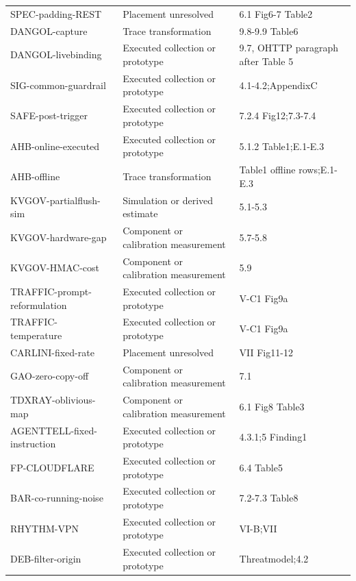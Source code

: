 \begin{longtable}{@{}p{}p{}p{}@{}}
SPEC-padding-REST~\cite{wei2024speculation} & Placement unresolved & 6.1 Fig6-7 Table2\\
DANGOL-capture~\cite{dangol2026workflow} & Trace transformation & 9.8-9.9 Table6\\
DANGOL-livebinding~\cite{dangol2026workflow} & Executed collection or prototype & 9.7, OHTTP paragraph after Table 5\\
SIG-common-guardrail~\cite{geng2026sigleak} & Executed collection or prototype & 4.1-4.2;AppendixC\\
SAFE-post-trigger~\cite{chu2025safekv} & Executed collection or prototype & 7.2.4 Fig12;7.3-7.4\\
AHB-online-executed~\cite{zhu2026turing} & Executed collection or prototype & 5.1.2 Table1;E.1-E.3\\
AHB-offline~\cite{zhu2026turing} & Trace transformation & Table1 offline rows;E.1-E.3\\
KVGOV-partialflush-sim~\cite{addagada2026kvgov} & Simulation or derived estimate & 5.1-5.3\\
KVGOV-hardware-gap~\cite{addagada2026kvgov} & Component or calibration measurement & 5.7-5.8\\
KVGOV-HMAC-cost~\cite{addagada2026kvgov} & Component or calibration measurement & 5.9\\
TRAFFIC-prompt-reformulation~\cite{pouryousef2026traffic} & Executed collection or prototype & V-C1 Fig9a\\
TRAFFIC-temperature~\cite{pouryousef2026traffic} & Executed collection or prototype & V-C1 Fig9a\\
CARLINI-fixed-rate~\cite{carlini2024remote} & Placement unresolved & VII Fig11-12\\
GAO-zero-copy-off~\cite{gao2025iknow} & Component or calibration measurement & 7.1\\
TDXRAY-oblivious-map~\cite{hornetz2026tdxray} & Component or calibration measurement & 6.1 Fig8 Table3\\
AGENTTELL-fixed-instruction~\cite{shahriar2026agenttell} & Executed collection or prototype & 4.3.1;5 Finding1\\
FP-CLOUDFLARE~\cite{wang2026fpagent} & Executed collection or prototype & 6.4 Table5\\
BAR-co-running-noise~\cite{gu2026behindbars} & Executed collection or prototype & 7.2-7.3 Table8\\
RHYTHM-VPN~\cite{alhazbi2025rhythm} & Executed collection or prototype & VI-B;VII\\
DEB-filter-origin~\cite{debenedetti2024privacy} & Executed collection or prototype & Threatmodel;4.2\\

\end{longtable}
